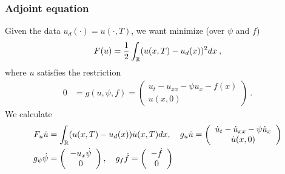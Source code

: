 \documentclass{beamer}
\begin{document}
\begin{frame}
\frametitle{Adjoint equation}
Given the \alert{data} $u_d(\cdot) = u(\cdot, T)$, we want minimize (over $\psi$ and $f$)
\begin{equation*}
  \begin{split}
    F(u) = \frac{1}{2} \int_{\mathbb{R}} (u(x,T) - u_d(x))^2 dx\:,
  \end{split}
\end{equation*}
where $u$ satisfies the restriction
\begin{equation}\label{restriction}
	\begin{split}
	  0 &= g(u, \psi, f) = 
	  \left( \begin{array}{c}
          u_t - u_{xx} - \psi u_x - f(x) \\
          u(x, 0) \end{array} \right)\:.
	\end{split}
\end{equation}
We calculate
\begin{equation*}
  \begin{split}
    F_{u} \dot{u} &= \int_{\mathbb{R}} (u(x, T) - u_{d}(x)) \dot{u}(x, T) dx, \quad
    g_{u} \dot{u} = \left( \begin{array}{c}
                                    \dot{u}_t - \dot{u}_{xx} - \psi \dot{u}_x\\
                                    \dot{u}(x, 0) \end{array} \right)\\
    g_{\psi} \dot{\psi} &= \left( \begin{array}{c}
                                    - u_x \dot{\psi}\\
                                    0 \end{array} \right), \quad
    g_{f} \dot{f} = \left( \begin{array}{c}
                                    - \dot{f}\\
                                    0 \end{array} \right)
  \end{split}
\end{equation*}
\end{frame}
\end{document}
